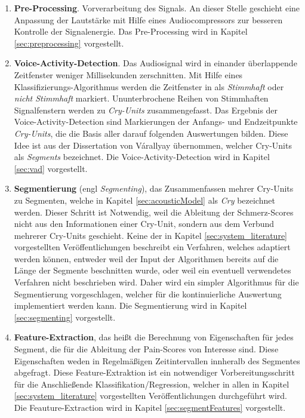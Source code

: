\begin{enumerate}[leftmargin=*]
	\item \textbf{Pre-Processing}. Vorverarbeitung des Signals. An dieser Stelle geschieht eine Anpassung der Lautstärke mit Hilfe eines Audiocompressors zur besseren Kontrolle der Signalenergie. Das Pre-Processing wird in Kapitel \ref{sec:preprocessing} vorgestellt.
	
	\item \textbf{Voice-Activity-Detection}. Das Audiosignal wird in einander überlappende Zeitfenster weniger Millisekunden zerschnitten. Mit Hilfe eines Klassifizierungs-Algorithmus werden die Zeitfenster in als \emph{Stimmhaft} oder \emph{nicht Stimmhaft} markiert. Ununterbrochene Reihen von Stimmhaften Signalfenstern werden zu \emph{Cry-Units} zusammengefasst. Das Ergebnis der Voice-Activity-Detection sind Markierungen der Anfangs- und Endzeitpunkte \emph{Cry-Units}, die die Basis aller darauf folgenden Auswertungen bilden. Diese Idee ist aus der Dissertation von Várallyay \cite[S. 16 - 17]{cry_thesis} übernommen, welcher Cry-Units als \emph{Segments} bezeichnet. Die Voice-Activity-Detection wird in Kapitel \ref{sec:vad} vorgestellt.
	
	\item \textbf{Segmentierung} (engl \emph{Segmenting}), das Zusammenfassen mehrer Cry-Units zu Segmenten, welche in Kapitel \ref{sec:acousticModel} als \emph{Cry} bezeichnet werden. Dieser Schritt ist Notwendig, weil die Ableitung der Schmerz-Scores nicht aus den Informationen einer Cry-Unit, sondern aus dem Verbund mehrerer Cry-Units geschieht. Keine der in Kapitel \ref{sec:system_literature} vorgestellten Veröffentlichungen beschreibt ein Verfahren, welches  adaptiert werden können, entweder weil der Input der Algorithmen bereits auf die Länge der Segmente beschnitten wurde, oder weil ein eventuell verwendetes Verfahren nicht beschrieben wird. Daher wird ein simpler Algorithmus für die Segmentierung vorgeschlagen, welcher für die kontinuierliche Auswertung implementiert werden kann. Die Segmentierung wird in Kapitel \ref{sec:segmenting} vorgestellt.		
	
	\item \textbf{Feature-Extraction}, das heißt die Berechnung von Eigenschaften für jedes Segment, die für die Ableitung der Pain-Scores von Interesse sind. Diese Eigenschaften weden in Regelmäßigen Zeitintervallen innheralb des Segmentes abgefragt. Diese Feature-Extraktion ist ein notwendiger Vorbereitungsschritt für die Anschließende Klassifikation/Regression, welcher in allen in Kapitel \ref{sec:system_literature} vorgestellten Veröffentlichungen durchgeführt wird.
	Die Feauture-Extraction wird in Kapitel \ref{sec:segmentFeatures} vorgestellt.	
	

\end{enumerate}
